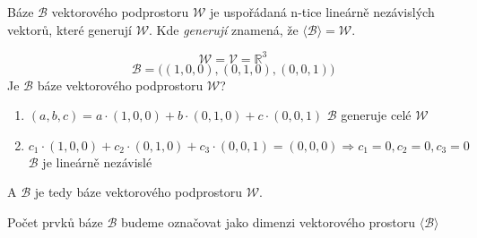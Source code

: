 \begin{definition}
    Báze $\mathcal{B}$ vektorového podprostoru $\mathcal{W}$ je uspořádaná n-tice lineárně
    nezávislých vektorů, které generují $\mathcal{W}$.
    Kde \textit{generují} znamená, že $\langle \mathcal{B} \rangle = \mathcal{W}$.
\end{definition}

\begin{example}
    $$\mathcal{W} = \mathcal{V} = \mathbb{R}^3$$
    $$\mathcal{B} = \big((1, 0, 0), (0, 1, 0), (0, 0, 1)\big)$$
    Je $\mathcal{B}$ báze vektorového podprostoru $\mathcal{W}$?
    \begin{enumerate}
        \item $(a, b, c) = a \cdot(1, 0, 0) + b \cdot (0, 1, 0) + c \cdot (0, 0, 1)$ \hfill
            $\mathcal{B}$ generuje celé $\mathcal{W}$
        \item $c_1 \cdot(1, 0, 0) + c_2 \cdot (0, 1, 0) + c_3 \cdot (0, 0, 1) = (0, 0, 0)
            \Rightarrow c_1 = 0, c_2 = 0, c_3 = 0$ \hfill $\mathcal{B}$ je lineárně nezávislé
    \end{enumerate}
    A $\mathcal{B}$ je tedy báze vektorového podprostoru $\mathcal{W}$.
\end{example}

\begin{definition}
    Počet prvků báze $\mathcal{B}$ budeme označovat jako dimenzi vektorového
        prostoru $\langle \mathcal{B} \rangle$
\end{definition}

